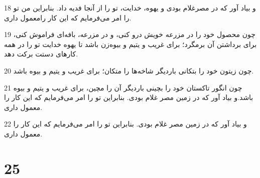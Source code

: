 \par 18 و بیاد آور که در مصرغلام بودی و یهوه، خدایت، تو را از آنجا فدیه داد. بنابراین من تو را امر می‌فرمایم که این کار رامعمول داری.
\par 19 چون محصول خود را در مزرعه خویش درو کنی، و در مزرعه، بافه‌ای فراموش کنی، برای برداشتن آن برمگرد؛ برای غریب و یتیم و بیوه‌زن باشد تا یهوه خدایت تو را در همه کارهای دستت برکت دهد.
\par 20 چون زیتون خود را بتکانی باردیگر شاخه‌ها را متکان؛ برای غریب و یتیم و بیوه باشد.
\par 21 چون انگور تاکستان خود را بچینی باردیگر آن را مچین، برای غریب و یتیم و بیوه باشد.و بیاد آور که در زمین مصر غلام بودی. بنابراین تو را امر می‌فرمایم که این کار را معمول داری.
\par 22 و بیاد آور که در زمین مصر غلام بودی. بنابراین تو را امر می‌فرمایم که این کار را معمول داری.
 
\chapter{25}

